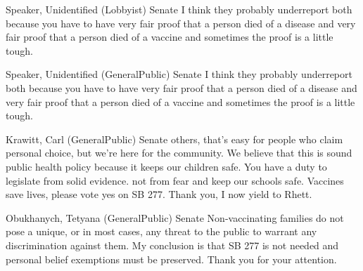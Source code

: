 \begin{result}{9.241784334021503}{Speaker, Unidentified (Lobbyist) Senate}
I think they probably underreport both because you have to have very fair proof that a person died of a disease and very fair proof that a person died of a vaccine and sometimes the proof is a little tough.
\end{result}

\begin{result}{9.241784334021503}{Speaker, Unidentified (GeneralPublic) Senate}
I think they probably underreport both because you have to have very fair proof that a person died of a disease and very fair proof that a person died of a vaccine and sometimes the proof is a little tough.
\end{result}

\begin{result}{9.212042150184399}{Krawitt, Carl (GeneralPublic) Senate}
others, that's easy for people who claim personal choice, but we're here for the community. We believe that this is sound public health policy because it keeps our children safe. You have a duty to legislate from solid evidence. not from fear and keep our schools safe. Vaccines save lives, please vote yes on SB 277. Thank you, I now yield to Rhett.
\end{result}

\begin{result}{9.155087277710894}{Obukhanych, Tetyana (GeneralPublic) Senate}
Non-vaccinating families do not pose a unique, or in most cases, any threat to the public to warrant any discrimination against them. My conclusion is that SB 277 is not needed and personal belief exemptions must be preserved. Thank you for your attention.
\end{result}

